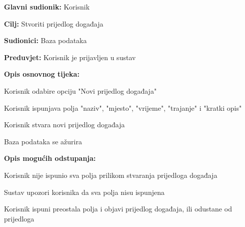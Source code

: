 					\begin{packed_item}
	
						\item \textbf{Glavni sudionik: }Korisnik
						\item  \textbf{Cilj:} Stvoriti prijedlog događaja
						\item  \textbf{Sudionici:} Baza podataka
						\item  \textbf{Preduvjet:} Korisnik je prijavljen u sustav
						\item  \textbf{Opis osnovnog tijeka:}
						
						\item[] \begin{packed_enum}
	
							\item Korisnik odabire opciju "Novi prijedlog događaja" 
							\item Korisnik ispunjava polja "naziv", "mjesto", "vrijeme", "trajanje" i "kratki opis"
							\item Korisnik stvara novi prijedlog događaja
							\item Baza podataka se ažurira
						\end{packed_enum}
						
						\item  \textbf{Opis mogućih odstupanja:}
						
						\item[] \begin{packed_item}
	
							\item[2.a] Korisnik nije ispunio sva polja prilikom stvaranja prijedloga događaja
							\item[] \begin{packed_enum}
								
								\item Sustav upozori korisnika da sva polja nisu ispunjena
								\item Korisnik ispuni preostala polja i objavi prijedlog događaja, ili odustane od prijedloga
								
							\end{packed_enum}
							
							
						\end{packed_item}
					\end{packed_item}						
					\noindent {}
